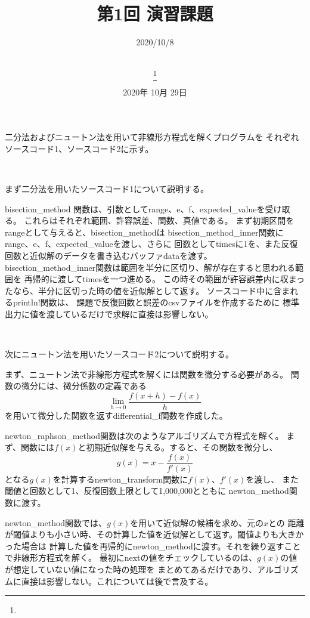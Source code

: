 \documentclass[uplatex, 11pt,a4j, titlepage]{jsarticle}
\title{第1回 演習課題}
\date{2020年 10月 29日}
\author{
    \small{\myid} \\
    \myname\thanks{\mymail}
}
\begin{document}
\maketitle


\subtitle{2020/10/8}


二分法およびニュートン法を用いて非線形方程式を解くプログラムを
それぞれソースコード1、ソースコード2に示す。

\ 

まず二分法を用いたソースコード1について説明する。

bisection\_method 関数は、引数としてrange、e、f、expected_valueを受け取る。
これらはそれぞれ範囲、許容誤差、関数、真値である。
まず初期区間をrangeとして与えると、bisection\_methodは
bisection\_method\_inner関数にrange、e、f、expected\_valueを渡し、さらに
回数としてtimesに1を、また反復回数と近似解のデータを書き込むバッファdataを渡す。
bisection\_method\_inner関数は範囲を半分に区切り、解が存在すると思われる範囲を
再帰的に渡してtimesを一つ進める。
この時その範囲が許容誤差内に収まったなら、半分に区切った時の値を近似解として返す。
ソースコード中に含まれるprintln!関数は、
課題で反復回数と誤差のcsvファイルを作成するために
標準出力に値を渡しているだけで求解に直接は影響しない。

\ 

次にニュートン法を用いたソースコード2について説明する。

まず、ニュートン法で非線形方程式を解くには関数を微分する必要がある。
関数の微分には、微分係数の定義である
\begin{equation}
    \lim_{h \to 0} \frac{f(x + h) - f(x)}{h}   
\end{equation}
を用いて微分した関数を返すdifferential\_f関数を作成した。

newton\_raphson\_method関数は次のようなアルゴリズムで方程式を解く。
まず、関数には$f(x)$と初期近似解を与える。すると、その関数を微分し、
\begin{equation}
    g(x) = x - \frac{f(x)}{f'(x)}
\end{equation}
となる$g(x)$を計算するnewton\_transform関数に$f(x)$、$f'(x)$を渡し、
また閾値と回数として1、反復回数上限として1,000,000とともに
newton\_method関数に渡す。

newton\_method関数では、$g(x)$を用いて近似解の候補を求め、元の$x$との
距離が閾値よりも小さい時、その計算した値を近似解として返す。閾値よりも大きかった場合は
計算した値を再帰的にnewton\_methodに渡す。それを繰り返すことで非線形方程式を解く。
最初にnextの値をチェックしているのは、$g(x)$の値が想定していない値になった時の処理を
まとめてあるだけであり、アルゴリズムに直接は影響しない。これについては後で言及する。
\end{document}
